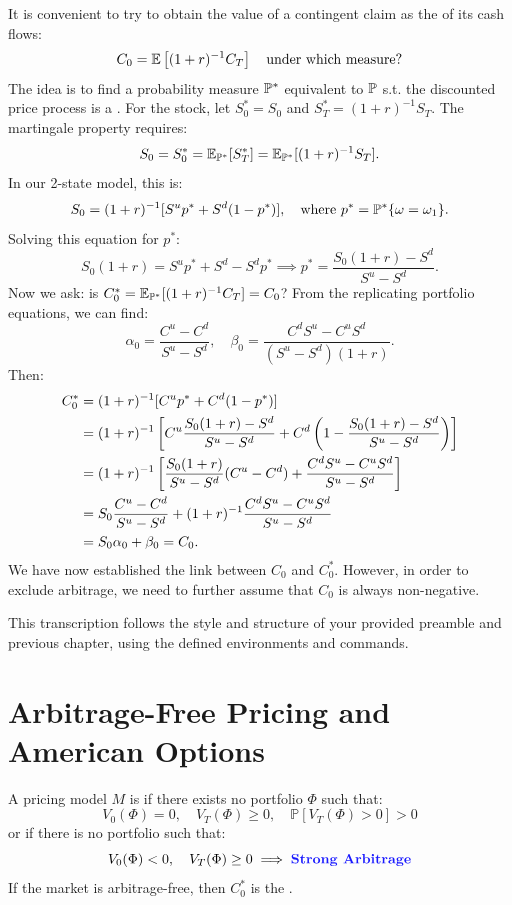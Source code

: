 \begin{remark}
    It is convenient to try to obtain the value of a contingent claim as the  of its cash flows:
    \[ C_0 = \mathbb E \left[ (1+r)^{-1} C_T \right] \quad \text{under which measure?} \]
    The idea is to find a probability measure $\mathbb P^*$ equivalent to $\mathbb P$ s.t. the discounted price process is a .
    For the stock, let $S_0^* = S_0$ and $S_T^* = (1+r)^{-1} S_T$. The martingale property requires:
    \[ S_0 = S_0^* = \mathbb E_{\mathbb P^*}[S_T^*] = \mathbb E_{\mathbb P^*}[(1+r)^{-1} S_T]. \]
    In our 2-state model, this is:
    \[ S_0 = (1+r)^{-1} [S^u p^* + S^d (1-p^*)], \quad \text{where } p^* = \mathbb P^*\{\omega = \omega_1\}. \]
    Solving this equation for $p^*$:
    \[ S_0(1+r) = S^u p^* + S^d - S^d p^* \implies p^* = \frac{S_0(1+r) - S^d}{S^u - S^d}. \]
    Now we ask: is $C_0^* = \mathbb E_{\mathbb P^*}[(1+r)^{-1} C_T] = C_0$?
    From the replicating portfolio equations, we can find:
    \[ \alpha_0 = \frac{C^u - C^d}{S^u - S^d}, \quad \beta_0 = \frac{C^d S^u - C^u S^d}{(S^u - S^d)(1+r)}. \]
    Then:
    \begin{align*}
        C_0^* &= (1+r)^{-1} [C^u p^* + C^d (1-p^*)] \\
        &= (1+r)^{-1} \left[ C^u \frac{S_0(1+r) - S^d}{S^u - S^d} + C^d \left(1 - \frac{S_0(1+r) - S^d}{S^u - S^d}\right) \right] \\
        &= (1+r)^{-1} \left[ \frac{S_0(1+r)}{S^u - S^d} (C^u - C^d) + \frac{C^d S^u - C^u S^d}{S^u - S^d} \right] \\
        &= S_0 \frac{C^u - C^d}{S^u - S^d} + (1+r)^{-1} \frac{C^d S^u - C^u S^d}{S^u - S^d} \\
        &= S_0 \alpha_0 + \beta_0 = C_0.
    \end{align*}
    We have now established the link between $C_0$ and $C_0^*$. However, in order to exclude arbitrage, we need to further assume that $C_0$ is always non-negative.
\end{remark}

This transcription follows the style and structure of your provided preamble and previous chapter, using the defined environments and commands.

\section{Arbitrage-Free Pricing and American Options}

\begin{definition}
    A pricing model $M$ is  if there exists no portfolio $\Phi$ such that:
    \[ V_0(\Phi) = 0, \quad V_T(\Phi) \geq 0, \quad \mathbb{P}[V_T(\Phi) > 0] > 0 \]
    or if there is no portfolio such that:
    \[ V_0(\Phi) < 0, \quad V_T(\Phi) \geq 0 \implies \text{\vocab{Strong Arbitrage}} \]
    If the market is arbitrage-free, then $C_0^*$ is the .
\end{definition}


